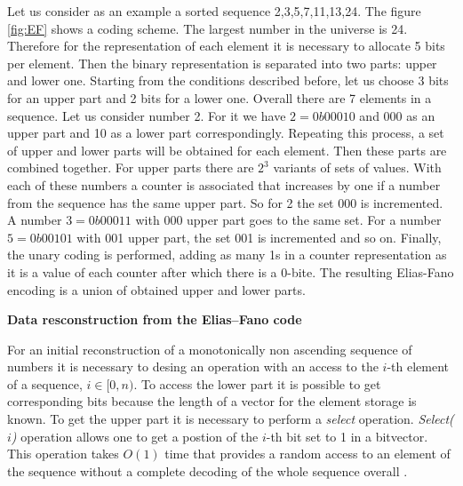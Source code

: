 Let us consider as an example a sorted sequence {2,3,5,7,11,13,24}.
The figure \ref{fig:EF} shows a coding scheme. The largest number in the universe is 24.
Therefore for the representation of each element it is necessary to allocate 5 bits per element.
Then the binary representation is separated into two parts: upper and lower one.
Starting from the conditions described before, let us choose 3 bits for an upper part and 2 bits for a lower one.
Overall there are 7 elements in a sequence. Let us consider number 2.
For it we have $2 = 0b00010$ and 000 as an upper part and 10 as a lower part correspondingly.
Repeating this process, a set of upper and lower parts will be obtained for each element.
Then these parts are combined together. For upper parts there are $2^3$ variants of sets of values.
With each of these numbers a counter is associated that increases by one if a number from the sequence
has the same upper part. So for 2 the set 000 is incremented. A number $3 = 0b00011$ with 000 upper part
goes to the same set. For a number $5 = 0b00101$ with 001 upper part, the set 001 is incremented and so on.
Finally, the unary coding is performed, adding as many 1s in a counter representation as it is a value of
each counter after which there is a 0-bite. The resulting Elias-Fano encoding is a union of obtained
upper and lower parts.

\textbf{Data resconstruction from the Elias--Fano code}

For an initial reconstruction of a monotonically non ascending sequence of numbers it is necessary to
desing an operation with an access to the $i$-th element of a sequence, $i \in [0, n)$.
To access the lower part it is possible to get corresponding bits because the length of a vector for
the element storage is known.
To get the upper part it is necessary to perform a \emph{select} operation. \emph{Select($i$)}
operation allows one to get a postion of the $i$-th bit set to 1 in a bitvector.
This operation takes $O(1)$ time that provides a random access to an element
of the sequence without a complete decoding of the whole sequence overall \cite{farina2009rank}.
